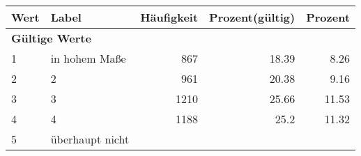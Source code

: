      \begin{longtable}{lXrrr}
     \toprule
     \textbf{Wert} & \textbf{Label} & \textbf{Häufigkeit} & \textbf{Prozent(gültig)} & \textbf{Prozent} \\
     \endhead
     \midrule
     \multicolumn{5}{l}{\textbf{Gültige Werte}}\\

     1 &
     \multicolumn{1}{X}{ in hohem Maße   } &


       \num{867} &
       \num[round-mode=places,round-precision=2]{18,39} &
         \num[round-mode=places,round-precision=2]{8,26} \\

     2 &
     \multicolumn{1}{X}{ 2   } &


       \num{961} &
       \num[round-mode=places,round-precision=2]{20,38} &
         \num[round-mode=places,round-precision=2]{9,16} \\

     3 &
     \multicolumn{1}{X}{ 3   } &


       \num{1210} &
       \num[round-mode=places,round-precision=2]{25,66} &
         \num[round-mode=places,round-precision=2]{11,53} \\

     4 &
     \multicolumn{1}{X}{ 4   } &


       \num{1188} &
       \num[round-mode=places,round-precision=2]{25,2} &
         \num[round-mode=places,round-precision=2]{11,32} \\

     5 &
     \multicolumn{1}{X}{ überhaupt nicht   } &



\end{longtable}
